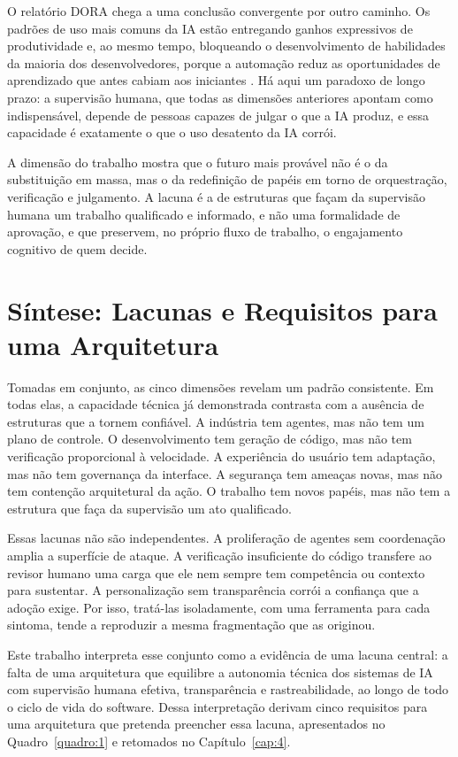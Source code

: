 O relatório DORA chega a uma conclusão convergente por outro caminho. Os padrões de uso mais comuns da IA estão entregando ganhos expressivos de produtividade e, ao mesmo tempo, bloqueando o desenvolvimento de habilidades da maioria dos desenvolvedores, porque a automação reduz as oportunidades de aprendizado que antes cabiam aos iniciantes \cite{dora2025}. Há aqui um paradoxo de longo prazo: a supervisão humana, que todas as dimensões anteriores apontam como indispensável, depende de pessoas capazes de julgar o que a IA produz, e essa capacidade é exatamente o que o uso desatento da IA corrói.

A dimensão do trabalho mostra que o futuro mais provável não é o da substituição em massa, mas o da redefinição de papéis em torno de orquestração, verificação e julgamento. A lacuna é a de estruturas que façam da supervisão humana um trabalho qualificado e informado, e não uma formalidade de aprovação, e que preservem, no próprio fluxo de trabalho, o engajamento cognitivo de quem decide.

\section{Síntese: Lacunas e Requisitos para uma Arquitetura}\label{sec:2.6}

Tomadas em conjunto, as cinco dimensões revelam um padrão consistente. Em todas elas, a capacidade técnica já demonstrada contrasta com a ausência de estruturas que a tornem confiável. A indústria tem agentes, mas não tem um plano de controle. O desenvolvimento tem geração de código, mas não tem verificação proporcional à velocidade. A experiência do usuário tem adaptação, mas não tem governança da interface. A segurança tem ameaças novas, mas não tem contenção arquitetural da ação. O trabalho tem novos papéis, mas não tem a estrutura que faça da supervisão um ato qualificado.

Essas lacunas não são independentes. A proliferação de agentes sem coordenação amplia a superfície de ataque. A verificação insuficiente do código transfere ao revisor humano uma carga que ele nem sempre tem competência ou contexto para sustentar. A personalização sem transparência corrói a confiança que a adoção exige. Por isso, tratá-las isoladamente, com uma ferramenta para cada sintoma, tende a reproduzir a mesma fragmentação que as originou.

Este trabalho interpreta esse conjunto como a evidência de uma lacuna central: a falta de uma arquitetura que equilibre a autonomia técnica dos sistemas de IA com supervisão humana efetiva, transparência e rastreabilidade, ao longo de todo o ciclo de vida do software. Dessa interpretação derivam cinco requisitos para uma arquitetura que pretenda preencher essa lacuna, apresentados no Quadro~\ref{quadro:1} e retomados no Capítulo~\ref{cap:4}.

